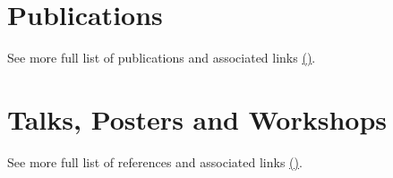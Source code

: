 \documentclass{mycv}
\begin{document}
%
%


\section{Publications}
See more full list of publications and associated links \href{https://github.com/mxochicale/cv/blob/main/tex/publications.bib}{(\faExternalLink*)}.

\section{Talks, Posters and Workshops}
See more full list of references and associated links \href{https://github.com/mxochicale/cv/blob/main/tex/talks-and-posters.bib}{(\faExternalLink*)}.
\end{document}
